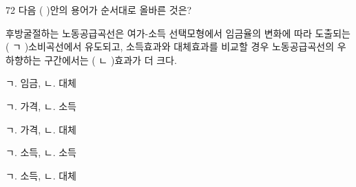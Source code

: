 \begin{question}{72}
다음 ( )안의 용어가 순서대로 올바른 것은?
\begin{framedtext}
후방굴절하는 노동공급곡선은 여가-소득 선택모형에서 임금율의 변화에 따라 도출되는 ( ㄱ )소비곡선에서 유도되고, 소득효과와 대체효과를 비교할 경우 노동공급곡선의 우하향하는 구간에서는 ( ㄴ )효과가 더 크다.
\end{framedtext}
\begin{choices}
  \item ㄱ. 임금, ㄴ. 대체
  \item ㄱ. 가격, ㄴ. 소득
  \item ㄱ. 가격, ㄴ. 대체
  \item ㄱ. 소득, ㄴ. 소득
  \item ㄱ. 소득, ㄴ. 대체
\end{choices}
\end{question}

